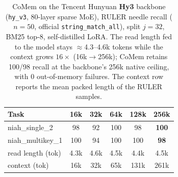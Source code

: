 \begin{table}[!htbp]
\centering
\small
\begin{tabular}{@{}lccccc@{}}
\toprule
\textbf{Task} & 16k & 32k & 64k & 128k & 256k \\
\midrule
niah\_single\_2   &  98 & 92 & 100 &  98 & \textbf{100} \\
niah\_multikey\_1 & 100 & 94 & 100 & 100 & \textbf{98} \\
\midrule
read length (tok) & 4.3k & 4.6k & 4.5k & 4.4k & 4.5k \\
context (tok)     & 16k  & 32k  & 65k  & 131k & 261k \\
\bottomrule
\end{tabular}
\caption{CoMem on the Tencent Hunyuan \textbf{Hy3} backbone (\texttt{hy\_v3},
80-layer sparse MoE), RULER needle recall ($n{=}50$, official
\texttt{string\_match\_all}), split $j{=}32$, BM25 top-$8$, self-distilled LoRA.
The read length fed to the model stays $\approx$4.3--4.6k tokens while the
context grows $16\times$ (16k$\to$256k); CoMem retains 100/98 recall at the
backbone's 256k native ceiling, with $0$ out-of-memory failures. The context row
reports the mean packed length of the RULER samples.}
\label{tab:hy3ruler}
\end{table}
